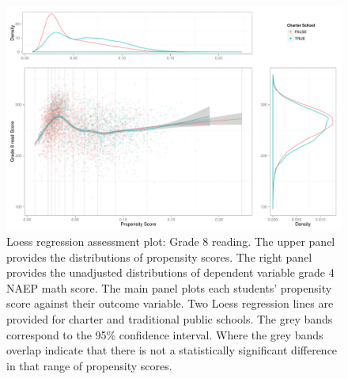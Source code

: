 \begin{figure}[h!]
\begin{center}
\includegraphics{../Figures2009/g8read-loess.pdf}
\caption[Loess regression assessment plot: Grade 8 reading]{Loess regression assessment plot: Grade 8 reading. The upper panel provides the distributions of propensity scores. The right panel provides the unadjusted distributions of dependent variable grade 4 NAEP math score. The main panel plots each students' propensity score against their outcome variable. Two Loess regression lines are provided for charter and traditional public schools. The grey bands correspond to the 95\% confidence interval. Where the grey bands overlap indicate that there is not a statistically significant difference in that range of propensity scores.}
\label{fig:g8read:loess}
\end{center}
\end{figure}

